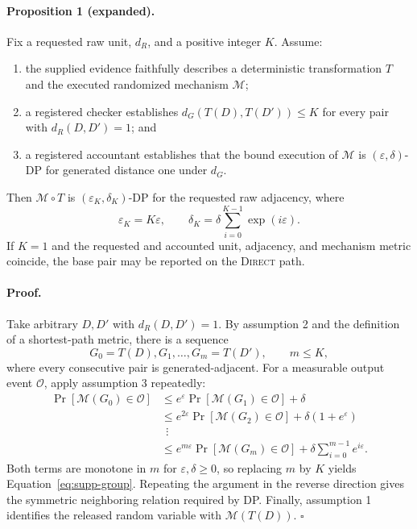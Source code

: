 \documentclass[letterpaper]{article} %
\newcommand{\Direct}{\textsc{Direct}}
\newcommand{\epsK}{\varepsilon_K}
\newcommand{\delK}{\delta_K}
\begin{document}
\paragraph{Proposition 1 (expanded).}
Fix a requested raw unit, $d_R$, and a positive integer $K$.  Assume:
\begin{enumerate}
\item the supplied evidence faithfully describes a deterministic
  transformation $T$ and the executed randomized mechanism $\mathcal{M}$;
\item a registered checker establishes
  $d_G(T(D),T(D'))\leq K$ for every pair with $d_R(D,D')=1$; and
\item a registered accountant establishes that the bound execution of
  $\mathcal{M}$ is $(\varepsilon,\delta)$-DP for generated distance one under
  $d_G$.
\end{enumerate}
Then $\mathcal{M}\circ T$ is $(\epsK,\delK)$-DP for the requested raw
adjacency, where
\begin{equation}
  \epsK=K\varepsilon,\qquad
  \delK=\delta\sum_{i=0}^{K-1}\exp(i\varepsilon).
  \label{eq:supp-group}
\end{equation}
If $K=1$ and the requested and accounted unit, adjacency, and mechanism metric
coincide, the base pair may be reported on the \Direct{} path.

\paragraph{Proof.}
Take arbitrary $D,D'$ with $d_R(D,D')=1$.  By assumption 2 and the definition
of a shortest-path metric, there is a sequence
\[
  G_0=T(D),G_1,\ldots,G_m=T(D'),\qquad m\leq K,
\]
where every consecutive pair is generated-adjacent.  For a measurable output
event $\mathcal{O}$, apply assumption 3 repeatedly:
\begin{align*}
\Pr[\mathcal{M}(G_0)\in\mathcal{O}]
&\leq e^\varepsilon\Pr[\mathcal{M}(G_1)\in\mathcal{O}]+\delta\\
&\leq e^{2\varepsilon}\Pr[\mathcal{M}(G_2)\in\mathcal{O}]
      +\delta(1+e^\varepsilon)\\
&\ \ \vdots\\
&\leq e^{m\varepsilon}\Pr[\mathcal{M}(G_m)\in\mathcal{O}]
      +\delta\sum_{i=0}^{m-1}e^{i\varepsilon}.
\end{align*}
Both terms are monotone in $m$ for $\varepsilon,\delta\geq0$, so replacing
$m$ by $K$ yields Equation~\eqref{eq:supp-group}.  Repeating the argument in
the reverse direction gives the symmetric neighboring relation required by
DP.  Finally, assumption 1 identifies the released random variable with
$\mathcal{M}(T(D))$. \hfill$\square$
\end{document}
